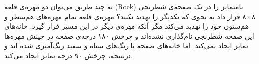 \p
به چند طریق می‌توان دو مهره‌ی قلعه
(Rook)
نامتمایز را در یک صفحه‌ی شطرنجی ۸×۸ قرار داد به نحوی که یکدیگر را تهدید نکنند؟
مهره‌ی قلعه تمام مهره‌های هم‌سطر و هم‌ستون خود را تهدید می‌کند مگر آنکه مهره‌ی دیگر در
این مسیر قرار گیرد.
خانه‌های این صفحه شطرنجی نام‌گذاری نشده‌اند و چرخش ۱۸۰ درجه‌ی صفحه در چینش مهره‌ها
تمایز ایجاد نمی‌کند. اما خانه‌های صفحه با رنگ‌های سیاه و سفید رنگ‌آمیزی شده اند و
درنتیجه، چرخش ۹۰ درجه تمایز ایجاد می‌کند. 
